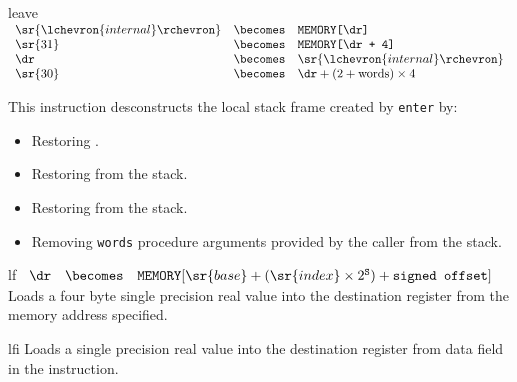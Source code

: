 \begin{instruction}{leave}\label{inst:leave}
     {
       \begin{math}
         \begin{array}{lcl}
           \sr{\lchevron{internal}\rchevron}     & \becomes & \texttt{MEMORY[\textrm{\dr}]} \\
           \sr{31} & \becomes & \texttt{MEMORY[\textrm{\dr} + 4]} \\
           \dr     & \becomes & \sr{\lchevron{internal}\rchevron} \\
           \sr{30} & \becomes & \dr + (2 + \textrm{words}) \times 4 \\
         \end{array}
       \end{math}
     }
     {This instruction desconstructs the local stack frame created
       by \texttt{enter} by:

       \begin{itemize}
       \item Restoring .
       \item Restoring \dr from the stack.
       \item Restoring  from the stack.
       \item Removing  \texttt{words} procedure arguments provided by the caller from the stack.
       \end{itemize}
     }
\end{instruction}

\begin{instruction}{lf}
     {\lfopc}
     {
       \begin{math}
         \begin{array}{lcl}
           {\dr} & \becomes & \texttt{MEMORY}[\sr{base} + (\sr{index} \times 2^{\texttt{S}}) + \texttt{signed offset}] \\
         \end{array}
       \end{math}
     }
     {
       Loads a four byte single precision real value
       into the destination register from the memory
       address specified.
     }
\end{instruction}


\begin{instruction}{lfi}
     {\lfiopc}
     {
       Loads a single precision real value into the
       destination register from data field in the instruction.
     }
\end{instruction}


